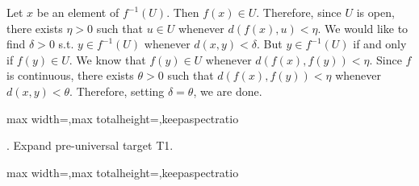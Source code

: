 \documentclass[a4paper,twoside,12pt]{article} %
\makeatletter
\DeclareRobustCommand{\_}{%
  \leavevmode\vbox{%
    \hrule\@width.4em
          \@height-.16ex
          \@depth\dimexpr.16ex+.28pt\relax}}
\newcommand\Tstrut{\rule{0pt}{2.4ex}}
\newcommand\Bstrut{\rule[-1.1ex]{0pt}{0pt}}
\newenvironment{fit}{\begin{adjustbox}{max width=\textwidth,max totalheight=\textheight,keepaspectratio}}{\end{adjustbox}}
\makeatother
\begin{document}
\begin{center}
\begin{minipage}{120mm}
Let $x$ be an element of $f^{-1}(U)$. Then $f(x)\in U$. Therefore, since $U$ is open, there exists $\eta > 0$ such that $u\in U$\textrm{ whenever }$\textit{d}(f(x),u) < \eta$. We would like to find $\delta > 0$ s.t. $y\in f^{-1}(U)$\textrm{ whenever }$\textit{d}(x,y) < \delta$. But $y\in f^{-1}(U)$ if and only if $f(y)\in U$. We know that $f(y)\in U$ whenever $\textit{d}(f(x),f(y)) < \eta$. Since $f$ is continuous, there exists $\theta > 0$ such that $\textit{d}(f(x),f(y)) < \eta$ whenever $\textit{d}(x,y) < \theta$. Therefore, setting $\delta = \theta$, we are done.
\end{minipage}
\end{center}

\bigskip
\begin{steps}
\begin{fit}%
\end{fit}
\smallskip

. Expand pre-universal target T1.\nopagebreak[4] 
\marginpar{}\nopagebreak[4] 
\smallskip\nopagebreak[4] 

\begin{fit}%
\end{fit}
\smallskip


\end{steps}
\end{document}
